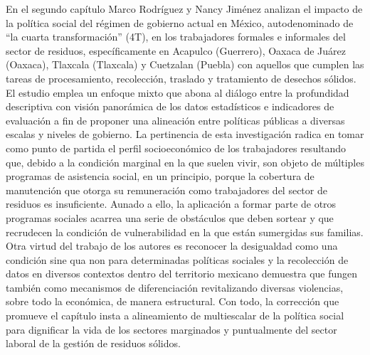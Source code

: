 \documentclass[
  spanish,
  11.5pt,
  170mm x 240mmpaper,
]{scrbook}
\begin{document}
En el segundo capítulo Marco Rodríguez y Nancy Jiménez analizan el
impacto de la política social del régimen de gobierno actual en México,
autodenominado de ``la cuarta transformación'' (4T), en los trabajadores
formales e informales del sector de residuos, específicamente en
Acapulco (Guerrero), Oaxaca de Juárez (Oaxaca), Tlaxcala (Tlaxcala) y
Cuetzalan (Puebla) con aquellos que cumplen las tareas de procesamiento,
recolección, traslado y tratamiento de desechos sólidos. El estudio
emplea un enfoque mixto que abona al diálogo entre la profundidad
descriptiva con visión panorámica de los datos estadísticos e
indicadores de evaluación a fin de proponer una alineación entre
políticas públicas a diversas escalas y niveles de gobierno. La
pertinencia de esta investigación radica en tomar como punto de partida
el perfil socioeconómico de los trabajadores resultando que, debido a la
condición marginal en la que suelen vivir, son objeto de múltiples
programas de asistencia social, en un principio, porque la cobertura de
manutención que otorga su remuneración como trabajadores del sector de
residuos es insuficiente. Aunado a ello, la aplicación a formar parte de
otros programas sociales acarrea una serie de obstáculos que deben
sortear y que recrudecen la condición de vulnerabilidad en la que están
sumergidas sus familias. Otra virtud del trabajo de los autores es
reconocer la desigualdad como una condición sine qua non para
determinadas políticas sociales y la recolección de datos en diversos
contextos dentro del territorio mexicano demuestra que fungen también
como mecanismos de diferenciación revitalizando diversas violencias,
sobre todo la económica, de manera estructural. Con todo, la corrección
que promueve el capítulo insta a alineamiento de multiescalar de la
política social para dignificar la vida de los sectores marginados y
puntualmente del sector laboral de la gestión de residuos sólidos.
\end{document}
